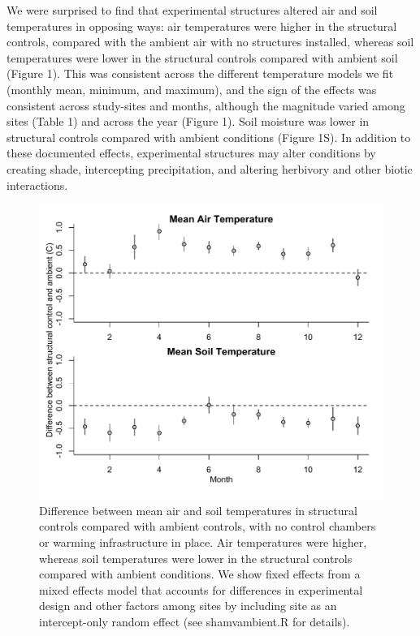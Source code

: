 \documentclass{article}
\begin{document}
\par We were surprised to find that experimental structures altered air and soil temperatures in opposing ways:  air temperatures were higher in the structural controls, compared with the ambient air with no structures installed, whereas soil temperatures were lower in the structural controls compared with ambient soil (Figure 1). This was consistent across the different temperature models we fit (monthly mean, minimum, and maximum), and the sign of the effects was consistent across study-sites and months, although the magnitude varied among sites (Table 1) and across the year (Figure 1). Soil moisture was lower in structural controls compared with ambient conditions (Figure 1S). In addition to these documented effects, experimental structures may alter conditions by creating shade, intercepting precipitation, and altering herbivory and other biotic interactions. %

 \begin{figure}[p]
     \centering
 \includegraphics{figures/ShamVSAmbient_mean.pdf}    
 \caption{Difference between mean air and soil temperatures in structural controls compared with ambient controls, with no control chambers or warming infrastructure in place. Air temperatures were higher, whereas soil temperatures were lower in the structural controls compared with ambient conditions. We show fixed effects from a mixed effects model that accounts for differences in experimental design and other factors among sites by including site as an intercept-only random effect (see shamvambient.R for details). }
 \end{figure}
\end{document}

